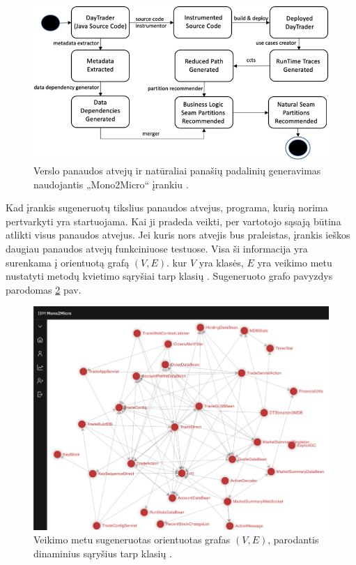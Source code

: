 \documentclass{VUMIFPSbakalaurinis}
\begin{document}
\begin{figure}[H]
    \centering
    \includegraphics{img/mono-2-micro-veikimas.png}
    \caption{Verslo panaudos atvejų ir natūraliai panašių padalinių generavimas naudojantis „Mono2Micro“ įrankiu \cite{KXL+20}.}
    \label{img:mono-2-micro}
\end{figure}

Kad įrankis sugeneruotų tikslius panaudos atvejus, programa, kurią norima pertvarkyti yra startuojama. Kai ji pradeda veikti, per vartotojo sąsają būtina atlikti visus panaudos atvejus. Jei kuris nors atvejis bus praleistas, įrankis ieškos daugiau panaudos atvejų funkciniuose testuose. Visa ši informacija yra surenkama į orientuotą grafą $(V, E)$. kur $V$ yra klasės, $E$ yra veikimo metu nustatyti metodų kvietimo sąryšiai tarp klasių \cite{KXL+20}. Sugeneruoto grafo pavyzdys parodomas \ref{img:mono-micro-grafas} pav.

\begin{figure}[H]
    \centering
    \includegraphics{img/mono-micro-grafas.png}
    \caption{Veikimo metu sugeneruotas orientuotas grafas $(V, E)$, parodantis dinaminius sąryšius tarp klasių \cite{KXL+20}.}
    \label{img:mono-micro-grafas}
\end{figure}
\end{document}
